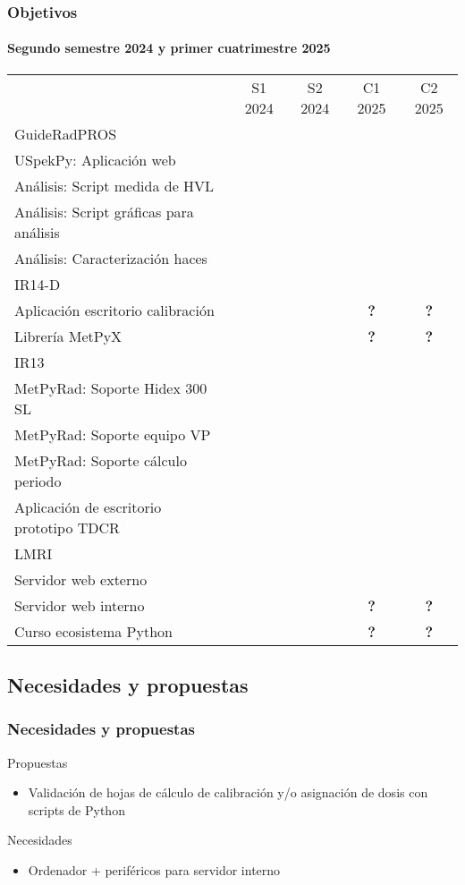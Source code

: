 \documentclass{beamer}
\newcommand{\highlight}[1]{{\color{blue} #1}}
\newcommand{\done}{{\color{green}\ding{52}}}
\newcommand{\todo}{{\color{red}\ding{56}}}
\newcommand{\doing}{{\color{orange}\ding{229}}}
\newcommand{\focus}{{\colorbox{red!30}{\textcolor{white}{\textbf{\tiny !}}}}}
\begin{document}
	\begin{frame}
		\frametitle{Objetivos}
		\framesubtitle{Segundo semestre 2024 y primer cuatrimestre 2025}
		\centering
		\scriptsize
		\begin{tabular}{lcccc}
			&S1 2024&S2 2024&C1 2025&C2 2025\\
			\rowcolor{blue!40}
			{\color{white}GuideRadPROS}&&&&\\
			USpekPy: Aplicación web                    &\doing&\doing&\doing&\doing\\
			Análisis: Script medida de HVL             &      &      &\todo &\\
			Análisis: Script gráficas para análisis    &      &      &\todo &\\
			Análisis: Caracterización haces \focus     &      &      &\todo &\\
			\rowcolor{blue!40}
			{\color{white}IR14-D}&&&&\\
			Aplicación escritorio calibración&\doing&\doing&\textbf{?}&\textbf{?}\\
			Librería MetPyX                  &\doing&\doing&\textbf{?}&\textbf{?}\\
			\rowcolor{blue!40}
			{\color{white}IR13}&&&&\\
			MetPyRad: Soporte Hidex 300 SL \focus          &&&\doing&\\
			MetPyRad: Soporte equipo VP \focus             &&&\todo &\doing\\
			MetPyRad: Soporte cálculo periodo \focus       &&&\todo &\doing\\
			Aplicación de escritorio prototipo TDCR \focus &&&\doing&\doing\\
			\rowcolor{blue!40}
			{\color{white}LMRI}&&&&\\
			Servidor web externo   &\doing&\doing&\doing    &\doing\\
			Servidor web interno   &\doing&\doing&\textbf{?}&\textbf{?}\\
			Curso ecosistema Python&      &\todo &\textbf{?}&\textbf{?}\\
		\end{tabular}
	\end{frame}
	
	\subsection{Necesidades y propuestas}
	
	\begin{frame}
		\frametitle{Necesidades y propuestas}
		\highlight{Propuestas}
		\begin{itemize}
			\item Validación de hojas de cálculo de calibración y/o asignación de dosis con scripts de Python
		\end{itemize}
		\highlight{Necesidades}
		\begin{itemize}
			\item Ordenador + periféricos para servidor interno \done
		\end{itemize}
	\end{frame}
	
\end{document}
